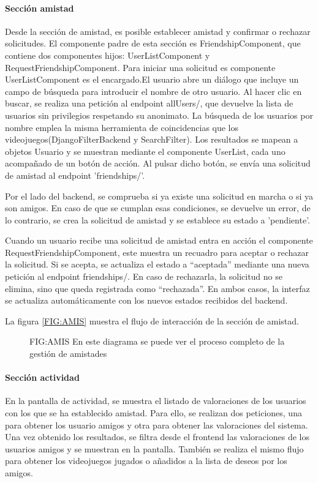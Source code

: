 \paragraph{Sección amistad}
Desde la sección de amistad, es posible establecer amistad y confirmar o rechazar solicitudes. El componente padre de esta sección 
es FriendshipComponent, que contiene dos componentes hijos:
UserListComponent y RequestFriendshipComponent.
Para iniciar una solicitud es componente UserListComponent es el encargado.El usuario abre un diálogo que incluye un campo de búsqueda para introducir el nombre de otro usuario. Al hacer clic en buscar, 
se realiza una petición al endpoint allUsers/, que devuelve la lista de usuarios sin privilegios respetando su anonimato. La búsqueda de los usuarios 
por nombre emplea la misma herramienta de coincidencias que los videojuegos(DjangoFilterBackend y SearchFilter). 
Los resultados se mapean a objetos Usuario y se muestran mediante el componente UserList, cada uno acompañado de un botón de acción. 
Al pulsar dicho botón, se envía una solicitud de amistad al endpoint 'friendships/'.

Por el lado del backend, se comprueba si ya existe una solicitud en marcha o si ya son amigos. En caso de que se cumplan 
esas condiciones, se devuelve un error, de lo contrario, se crea la solicitud de amistad y se establece su estado a 'pendiente'.

Cuando un usuario recibe una solicitud de amistad entra en acción el componente RequestFriendshipComponent, 
este muestra un recuadro para aceptar o rechazar la solicitud. Si se acepta, 
se actualiza el estado a “aceptada” mediante una nueva petición al endpoint friendships/. En caso de rechazarla, la solicitud no se elimina, 
sino que queda registrada como “rechazada”. En ambos casos, la interfaz se actualiza automáticamente con los nuevos estados recibidos del backend.

La figura \ref{FIG:AMIS} muestra el flujo de interacción de la sección de amistad.

\begin{figure}[Componentes implicados para la sección 'Amistades']{FIG:AMIS}{ En este diagrama se puede ver el proceso completo de la gestión de amistades}
\end{figure}

\paragraph{Sección actividad}
En la pantalla de actividad, se muestra el listado de valoraciones de los usuarios con los que se ha establecido amistad. Para ello, 
se realizan dos peticiones, una para obtener los usuario amigos y otra para obtener las valoraciones del sistema. Una vez obtenido los resultados, 
se filtra desde el frontend las valoraciones de los usuarios amigos y se muestran en la pantalla. También se realiza el mismo flujo 
para obtener los videojuegos jugados o añadidos a la lista de deseos por los amigos.
